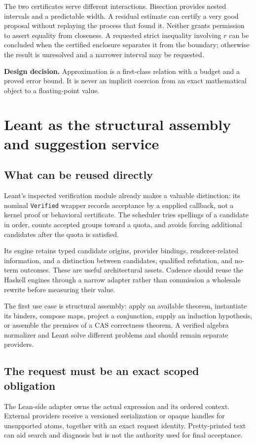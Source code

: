 \documentclass[11pt,letterpaper]{article}
\newcommand{\code}[1]{\nolinkurl{#1}}
\newcommand{\decision}[1]{\par\smallskip\textbf{Design decision.} #1\par\smallskip}
\theoremstyle{definition}
\begin{document}
The two certificates serve different interactions. Bisection provides nested
intervals and a predictable width. A residual estimate can certify a very good
proposal without replaying the process that found it. Neither grants permission
to assert equality from closeness. A requested strict inequality involving \(r\)
can be concluded when the certified enclosure separates it from the boundary;
otherwise the result is unresolved and a narrower interval may be requested.

\decision{Approximation is a first-class relation with a budget and a proved
error bound. It is never an implicit coercion from an exact mathematical object
to a floating-point value.}

\section{Leant as the structural assembly and suggestion service}\label{sec:leant}
\subsection{What can be reused directly}
Leant's inspected verification module already makes a valuable distinction:
its nominal \code{Verified} wrapper records acceptance by a supplied callback,
not a kernel proof or behavioral certificate. The scheduler tries spellings of a
candidate in order, counts accepted groups toward a quota, and avoids forcing
additional candidates after the quota is satisfied\cite{lverification}.

Its engine retains typed candidate origins, provider bindings, renderer-related
information, and a distinction between candidates, qualified refutation, and
no-term outcomes\cite{lengine}. These are useful architectural assets. Cadence
should reuse the Haskell engines through a narrow adapter rather than commission
a wholesale rewrite before measuring their value.

The first use case is structural assembly: apply an available theorem, instantiate
its binders, compose maps, project a conjunction, supply an induction hypothesis,
or assemble the premises of a CAS correctness theorem. A verified algebra
normalizer and Leant solve different problems and should remain separate providers.

\subsection{The request must be an exact scoped obligation}
The Lean-side adapter owns the actual expression and its ordered context. External
providers receive a versioned serialization or opaque handles for unsupported
atoms, together with an exact request identity. Pretty-printed text can aid search
and diagnosis but is not the authority used for final acceptance.
\end{document}
